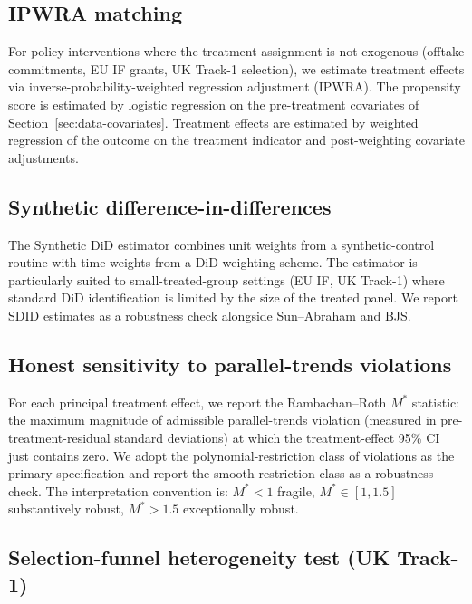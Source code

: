 \documentclass[12pt,a4paper]{article}
\theoremstyle{plain}
\theoremstyle{definition}
\begin{document}
\subsection{IPWRA matching}
\label{sec:method-ipwra}

For policy interventions where the treatment assignment is not exogenous (offtake commitments, EU IF grants, UK Track-1 selection), we estimate treatment effects via inverse-probability-weighted regression adjustment (IPWRA). The propensity score is estimated by logistic regression on the pre-treatment covariates of Section~\ref{sec:data-covariates}. Treatment effects are estimated by weighted regression of the outcome on the treatment indicator and post-weighting covariate adjustments.

\subsection{Synthetic difference-in-differences}
\label{sec:method-sdid}

The Synthetic DiD estimator \cite{arkhangelsky2021synthetic} combines unit weights from a synthetic-control routine with time weights from a DiD weighting scheme. The estimator is particularly suited to small-treated-group settings (EU IF, UK Track-1) where standard DiD identification is limited by the size of the treated panel. We report SDID estimates as a robustness check alongside Sun--Abraham and BJS.

\subsection{Honest sensitivity to parallel-trends violations}
\label{sec:method-rr}

For each principal treatment effect, we report the Rambachan--Roth $M^{*}$ statistic: the maximum magnitude of admissible parallel-trends violation (measured in pre-treatment-residual standard deviations) at which the treatment-effect 95\% CI just contains zero. We adopt the polynomial-restriction class of violations as the primary specification and report the smooth-restriction class as a robustness check. The interpretation convention is: $M^{*} < 1$ fragile, $M^{*} \in [1, 1.5]$ substantively robust, $M^{*} > 1.5$ exceptionally robust.

\subsection{Selection-funnel heterogeneity test (UK Track-1)}
\label{sec:method-funnel}
\end{document}

